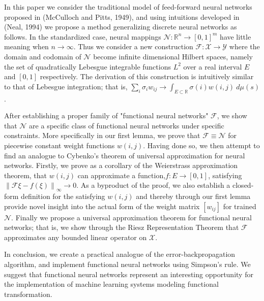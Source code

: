 In this paper we consider the traditional model of feed-forward neural networks proposed in (McCulloch and Pitts, 1949), and using intuitions developed in (Neal, 1994) we propose a method generalizing discrete neural networks as follows. In the standardized case, neural mappings $\mathcal{N}: \mathbb{R}^n \to [0,1]^m$ have little meaning when $n \to \infty$. Thus we consider a new construction $\mathcal{F}: \mathcal{X} \to \mathcal{Y}$ where the domain and codomain of $\mathcal{N}$ become infinite dimensional Hilbert spaces, namely the set of quadratically Lebesgue integrable functions $L^2$ over a real interval $E$ and $[0,1]$ respectively. The derivation of this construction is intuitively similar to that of Lebesgue integration; that is, $\sum_i \sigma_i w_{ij} \to \int_{E\subset\mathbb{R}}\sigma(i)w(i,j)\ d\mu(s)$. 

After establishing a proper family of "functional neural networks" $\mathcal{F}$, we show that $\mathcal{N}$ are a specific class of functional neural networks under specific constraints. More specifically in our first lemma, we prove that $\mathcal{F} \equiv \mathcal{N}$ for piecewise constant weight functions $w(i,j)$. Having done so, we then attempt to find an analogue to Cybenko's theorem of universal approximation for neural networks. Firstly, we prove as a corollary of the Weierstrass approximation theorem, that $w(i,j)$ can approximate a function,$f:E\to[0,1]$, satisfying $\left\|\mathcal{F}\xi - f(\xi)\right\|_\infty \to 0$. As a byproduct of the proof, we also establish a closed-form definition for the satisfying $w(i,j)$ and thereby through our first lemma provide novel insight into the actual form of the weight matrix $[w_{ij}]$ for trained $\mathcal{N}$. Finally we propose a universal approximation theorem for functional neural networks; that is, we show through the Riesz Representation Theorem that $\mathcal{F}$ approximates any bounded linear operator on $\mathcal{X}$.

In conclusion, we create a practical analogue of the error-backpropagation algorithm, and implement functional neural networks using Simpson’s rule. We suggest that functional neural networks represent an interesting opportunity for the implementation of machine learning systems modeling functional transformation.
